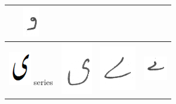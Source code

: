 \begin{table}[h]
\begin{tabular}{@{}cccc@{}}
\includegraphics[scale=0.15]{215} \\
\hline
\includegraphics[scale=0.15]{choti_ye_orig} series & \includegraphics[scale=0.15]{216} & \includegraphics[scale=0.15]{217} & 
\includegraphics[scale=0.15]{218} \\
\hline
\end{tabular}
\end{table}





